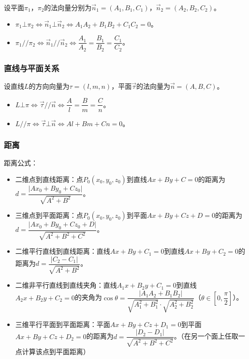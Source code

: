 \documentclass[UTF8, 12pt]{ctexart}
\begin{document}
        设平面$\pi_1$，$\pi_2$的法向量分别为$\vec{n}_1=(A_1,B_1,C_1)$，$\vec{n}_2=(A_2,B_2,C_2)$。

        \begin{itemize}
            \item $\pi_1\bot\pi_2\Leftrightarrow\vec{n}_1\bot\vec{n}_2\Leftrightarrow A_1A_2+B_1B_2+C_1C_2=0$。
            \item $\pi_1//\pi_2\Leftrightarrow\vec{n}_1//\vec{n}_2\Leftrightarrow\dfrac{A_1}{A_2}=\dfrac{B_1}{B_2}=\dfrac{C_1}{C_2}$。
        \end{itemize}

        \subsubsection{直线与平面关系}

        设直线$L$的方向向量为$\tau=(l,m,n)$，平面$\vec{\tau}$的法向量为$\vec{n}=(A,B,C)$。

        \begin{itemize}
            \item $L\bot\pi\Leftrightarrow\vec{\tau}//\vec{n}\Leftrightarrow\dfrac{A}{l}=\dfrac{B}{m}=\dfrac{C}{n}$。
            \item $L//\pi\Leftrightarrow\vec{\tau}\bot\vec{n}\Leftrightarrow Al+Bm+Cn=0$。
        \end{itemize}

        \subsubsection{距离}

        距离公式：

        \begin{itemize}
            \item 二维点到直线距离：点$P_0(x_0,y_0,z_0)$到直线$Ax+By+C=0$的距离为$d=\dfrac{\vert Ax_0+By_0+Cz_0\vert}{\sqrt{A^2+B^2}}$。
            \item 三维点到平面距离：点$P_0(x_0,y_0,z_0)$到平面$Ax+By+Cz+D=0$的距离为$d=\dfrac{\vert Ax_0+By_0+Cz_0+D\vert}{\sqrt{A^2+B^2+C^2}}$。
            \item 二维平行直线到直线距离：直线$Ax+By+C_1=0$到直线$Ax+By+C_2=0$的距离为$d=\dfrac{\vert C_2-C_1\vert}{\sqrt{A^2+B^2}}$。
            \item 二维非平行直线到直线夹角：直线$A_1x+B_2y+C_1=0$到直线$A_2x+B_2y+C_2=0$的夹角为$\cos\theta=\dfrac{\vert A_1A_2+B_1B_2\vert}{\sqrt{A_1^2+B_1^2}\cdot\sqrt{A_2^2+B_2^2}}$（$\theta\in\left[0,\dfrac{\pi}{2}\right]$）。
            \item 三维平行平面到平面距离：平面$Ax+By+Cz+D_1=0$到平面$Ax+By+Cz+D_2=0$的距离为$d=\dfrac{\vert D_2-D_1\vert}{\sqrt{A^2+B^2+C^2}}$。（在另一个面上任取一点计算该点到平面距离）
        \end{itemize}
\end{document}
